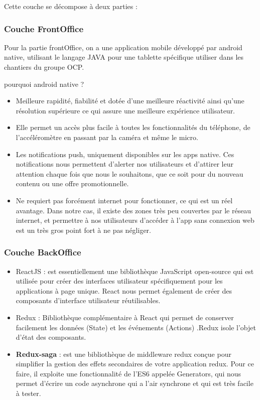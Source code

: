 Cette couche se d\'ecompose \`a deux parties :

\subsubsection{Couche FrontOffice}

Pour la partie frontOffice, on a une application mobile d\'evelopp\'e par android native, utilisant le langage JAVA pour une tablette sp\'ecifique utiliser dans les chantiers du groupe \gls{OCP}. 

pourquoi android native ? 

\begin{itemize}
\item Meilleure rapidit\'e, fiabilit\'e et dot\'ee d'une meilleure r\'eactivit\'e ainsi qu'une r\'esolution sup\'erieure ce qui assure une meilleure exp\'erience utilisateur.
\item Elle permet un acc\`es plus facile \`a toutes les fonctionnalit\'es du t\'el\'ephone, de l'acc\'el\'erom\`etre en passant par la cam\'era et m\^eme le micro.
\item Les notifications push, uniquement disponibles sur les apps native. Ces notifications nous permettent d'alerter nos utilisateurs et d'attirer leur attention chaque fois que nous le souhaitons, que ce soit pour du nouveau contenu ou une offre promotionnelle.
\item Ne requiert pas forc\'ement internet pour fonctionner, ce qui est un r\'eel avantage. Dans notre cas, il existe des zones tr\`es peu couvertes par le r\'eseau internet, et permettre \`a nos utilisateurs d'acc\'eder \`a l'app sans connexion web est un tr\`es gros point fort \`a ne pas n\'egliger.
\end{itemize}

\subsubsection{Couche BackOffice}
\begin{itemize}

\item \textcolor{react}{ReactJS} : est essentiellement une biblioth\`eque JavaScript open-source qui est utilis\'ee pour cr\'eer des interfaces utilisateur sp\'ecifiquement pour les applications \`a page unique. React nous permet \'egalement de cr\'eer des composants d'interface utilisateur r\'eutilisables.

\item \textcolor{redux}{Redux} : Biblioth\`eque compl\'ementaire \`a React qui permet de conserver facilement les donn\'ees (State) et les \'ev\'enements (Actions) .Redux isole l'objet d'\'etat des composants.

\item \textbf{Redux-saga} : est une biblioth\`eque de middleware redux con\c{c}ue pour simplifier la gestion des effets secondaires de votre application redux. Pour ce faire, il exploite une fonctionnalit\'e de l'ES6 appel\'ee Generators, qui nous permet d'\'ecrire un code asynchrone qui a l'air synchrone et qui est tr\`es facile \`a tester.
\end{itemize}


